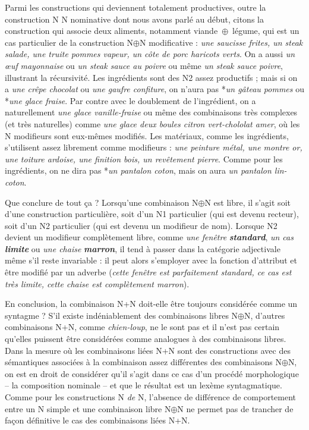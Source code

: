 {    Parmi les constructions qui deviennent totalement productives, outre la construction N N nominative dont nous avons parlé au début, citons la construction qui associe deux aliments, notamment viande~\textrm{${\oplus}$}~légume, qui est un cas particulier de la construction N\textrm{${\oplus}$}N modificative : \textit{une saucisse frites, un steak salade, une truite pommes vapeur, un côte de porc haricots verts}. On a aussi \textit{un œuf} \textit{mayonnaise} ou \textit{un steak sauce au poivre} ou même \textit{un steak sauce poivre}, illustrant la récursivité. Les ingrédients sont des N2 assez productifs ; mais si on a \textit{une crêpe chocolat} ou \textit{une gaufre confiture}, on n’aura pas *\textit{un gâteau pommes} ou *\textit{une glace fraise}. Par contre avec le doublement de l’ingrédient, on a naturellement \textit{une glace vanille-fraise} ou même des combinaisons très complexes (et très naturelles) comme \textit{une glace deux boules citron vert-chololat amer}, où les N modifieurs sont eux-mêmes modifiés. Les matériaux, comme les ingrédients, s’utilisent assez librement comme modifieurs : \textit{une peinture métal, une montre or, une toiture ardoise, une finition bois, un revêtement pierre}. Comme pour les ingrédients, on ne dira pas *\textit{un pantalon coton}, mais on aura \textit{un pantalon lin-coton}.

    Que conclure de tout ça ? Lorsqu’une combinaison N\textrm{${\oplus}$}N est libre, il s’agit soit d’une construction particulière, soit d’un N1 particulier (qui est devenu recteur), soit d’un N2 particulier (qui est devenu un modifieur de nom). Lorsque N2 devient un modifieur complètement libre, comme \textit{une fenêtre} \textbf{\textit{standard}}, \textit{un cas} \textbf{\textit{limite}} ou \textit{une chaise} \textbf{\textit{marron}}, il tend à passer dans la catégorie adjectivale même s’il reste invariable : il peut alors s’employer avec la fonction d’attribut et être modifié par un adverbe (\textit{cette fenêtre est parfaitement standard, ce cas est très limite, cette chaise est complètement marron}).

    En conclusion, la combinaison N+N doit-elle être toujours considérée comme un syntagme ? S’il existe indéniablement des combinaisons libres N\textrm{${\oplus}$}N, d’autres combinaisons N+N, comme \textit{chien-loup}, ne le sont pas et il n’est pas certain qu’elles puissent être considérées comme analogues à des combinaisons libres. Dans la mesure où les combinaisons liées N+N sont des constructions avec des sémantiques associées à la combinaison assez différentes des combinaisons N\textrm{${\oplus}$}N, on est en droit de considérer qu’il s’agit dans ce cas d’un procédé morphologique – la composition nominale – et que le résultat est un lexème syntagmatique. Comme pour les constructions N \textit{de} N, l’absence de différence de comportement entre un N simple et une combinaison libre N\textrm{${\oplus}$}N ne permet pas de trancher de façon définitive le cas des combinaisons liées N+N.
}
